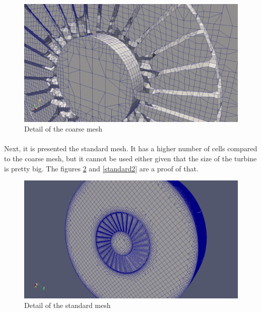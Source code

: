 \begin{figure}[h!]
\includegraphics[scale=0.24]{./mesh/screenshots/coarse3}
\centering
\caption{Detail of the coarse mesh}
\label{coarse2}
\end{figure}

\newpage{}

\paragraph{}Next, it is presented the standard mesh. It has a higher number of cells compared to the coarse mesh, but it cannot be used either given that the size of the turbine is pretty big. The figures \ref{standard1} and \ref{standard2} are a proof of that.

\begin{figure}[h!]
\includegraphics[scale=0.24]{./mesh/screenshots/std2}
\centering
\caption{Detail of the standard mesh}
\label{standard1}
\end{figure}

